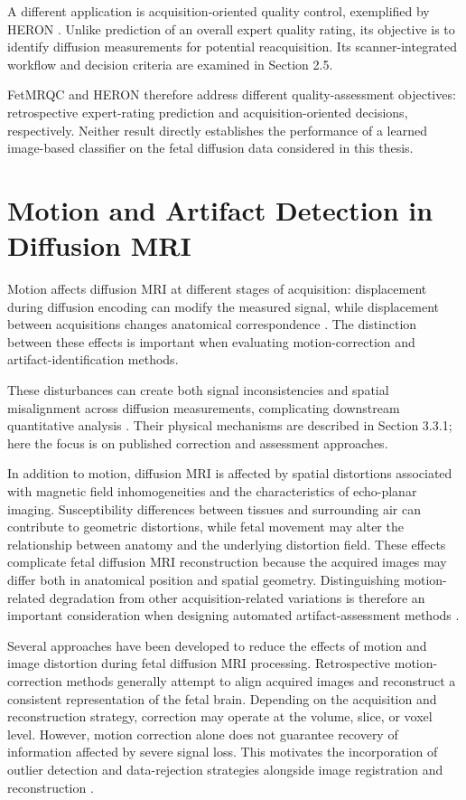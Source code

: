 A different application is acquisition-oriented quality control, exemplified by HERON \autocite{avilesverdera2025heron}. Unlike prediction of an overall expert quality rating, its objective is to identify diffusion measurements for potential reacquisition. Its scanner-integrated workflow and decision criteria are examined in Section 2.5.

FetMRQC and HERON therefore address different quality-assessment objectives: retrospective expert-rating prediction and acquisition-oriented decisions, respectively. Neither result directly establishes the performance of a learned image-based classifier on the fetal diffusion data considered in this thesis.

\section{Motion and Artifact Detection in Diffusion MRI}

Motion affects diffusion MRI at different stages of acquisition: displacement during diffusion encoding can modify the measured signal, while displacement between acquisitions changes anatomical correspondence \autocite{malamateniou2013motion,snoussi2025haitch}. The distinction between these effects is important when evaluating motion-correction and artifact-identification methods.

These disturbances can create both signal inconsistencies and spatial misalignment across diffusion measurements, complicating downstream quantitative analysis \autocite{snoussi2025haitch,avilesverdera2025heron}. Their physical mechanisms are described in Section 3.3.1; here the focus is on published correction and assessment approaches.

In addition to motion, diffusion MRI is affected by spatial distortions associated with magnetic field inhomogeneities and the characteristics of echo-planar imaging. Susceptibility differences between tissues and surrounding air can contribute to geometric distortions, while fetal movement may alter the relationship between anatomy and the underlying distortion field. These effects complicate fetal diffusion MRI reconstruction because the acquired images may differ both in anatomical position and spatial geometry. Distinguishing motion-related degradation from other acquisition-related variations is therefore an important consideration when designing automated artifact-assessment methods \autocite{snoussi2025haitch}.

Several approaches have been developed to reduce the effects of motion and image distortion during fetal diffusion MRI processing. Retrospective motion-correction methods generally attempt to align acquired images and reconstruct a consistent representation of the fetal brain. Depending on the acquisition and reconstruction strategy, correction may operate at the volume, slice, or voxel level. However, motion correction alone does not guarantee recovery of information affected by severe signal loss. This motivates the incorporation of outlier detection and data-rejection strategies alongside image registration and reconstruction \autocite{malamateniou2013motion,snoussi2025haitch}.


